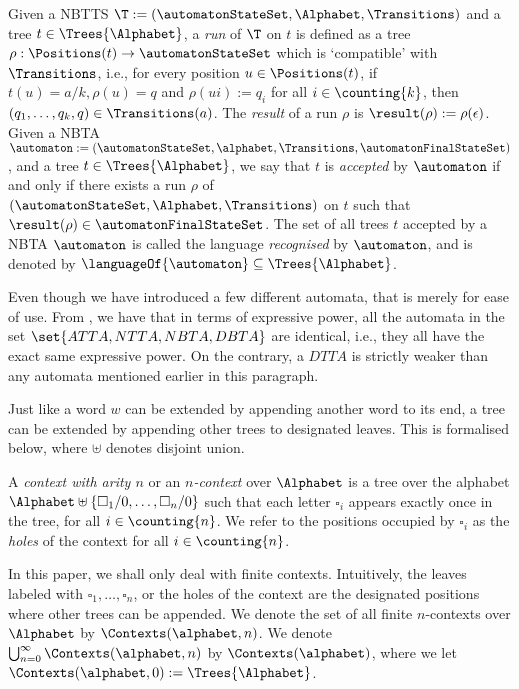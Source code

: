 \begin{definition}\label{def:acceptanceByNbta}
    Given a NBTTS $\T := (\automatonStateSet, \Alphabet, \Transitions)$ and a tree $t \in \Trees{\Alphabet}$, a \emph{run} of $\T$ on $t$ is defined as a tree $\rho : \Positions(t) \to \automatonStateSet$ which is `compatible' with $\Transitions$, i.e., for every position $u \in \Positions(t)$, if $t(u) = a/k, \rho(u) = q$ and $\rho(ui) := q_i$ for all $i \in \counting{k}$, then $(q_1, \dots, q_k, q) \in \Transitions(a)$. The \emph{result} of a run $\rho$ is $\result(\rho) := \rho(\epsilon)$. Given a NBTA $\automaton := (\automatonStateSet, \alphabet, \Transitions, \automatonFinalStateSet)$, and a tree $t \in \Trees{\Alphabet}$, we say that $t$ is \emph{accepted} by $\automaton$ if and only if there exists a run $\rho$ of $(\automatonStateSet, \Alphabet, \Transitions)$ on $t$ such that $\result(\rho) \in \automatonFinalStateSet$. The set of all trees $t$ accepted by a NBTA $\automaton$ is called the language \emph{recognised} by $\automaton$, and is denoted by $\languageOf{\automaton} \subseteq \Trees{\Alphabet}$.
\end{definition}

Even though we have introduced a few different automata, that is merely for ease of use. From \cite{tata}, we have that in terms of expressive power, all the automata in the set $\set{ATTA, NTTA, NBTA, DBTA}$ are identical, i.e., they all have the exact same expressive power. On the contrary, a $DTTA$ is strictly weaker than any automata mentioned earlier in this paragraph.

Just like a word $w$ can be extended by appending another word to its end, a tree can be extended by appending other trees to designated leaves. This is formalised below, where $ \uplus$ denotes disjoint union.

\begin{definition}[Context]\label{def:context}
    A \emph{context with arity $n$} or an \emph{$n$-context} over $\Alphabet$ is a tree over the alphabet $\Alphabet \uplus \{\square_1/0, \dots, \square_n/0\}$ such that each letter $\square_i$ appears exactly once in the tree, for all $i \in \counting{n}$. We refer to the positions occupied by $\square_i$ as the \emph{holes} of the context for all $i \in \counting{n}$.
\end{definition}

In this paper, we shall only deal with finite contexts. Intuitively, the leaves labeled with $\square_1, \dots, \square_n$, or the holes of the context are the designated positions where other trees can be appended. We denote the set of all finite $n$-contexts over $\Alphabet$ by $\Contexts(\alphabet, n)$. We denote $\bigcup_{n=0}^\infty \Contexts(\alphabet, n)$ by $\Contexts(\alphabet)$, where we let $\Contexts(\alphabet, 0) := \Trees{\Alphabet}$.

